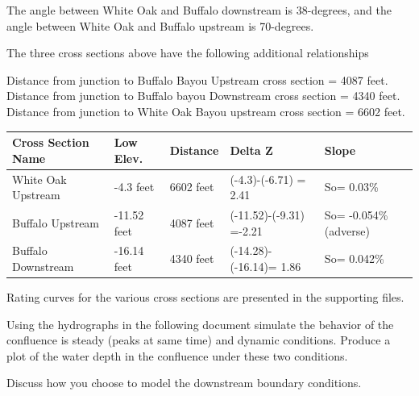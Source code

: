 \documentclass[12pt]{article}
\begin{document}
The angle between White Oak and Buffalo downstream is 38-degrees, and the angle between White Oak and Buffalo upstream is 70-degrees.

The three cross sections above have the following additional relationships

Distance from junction to Buffalo Bayou Upstream cross section = 4087 feet.\\
Distance from junction to Buffalo bayou Downstream cross section = 4340 feet.\\
Distance from junction to White Oak Bayou upstream cross section = 6602 feet.\\

\begin{tabular}{p{1.5in}p{0.9in}p{0.8in}p{1.65in}p{1in}}
Cross Section Name & Low Elev.&Distance& Delta Z&Slope \\
\hline
\hline
White Oak Upstream & -4.3 feet & 6602 feet & (-4.3)-(-6.71) = 2.41& So=  0.03\% \\
Buffalo Upstream & -11.52 feet & 4087 feet & (-11.52)-(-9.31) =-2.21 &So= -0.054\% (adverse) \\
Buffalo Downstream &  -16.14 feet &4340 feet & (-14.28)-(-16.14)= 1.86 &So=  0.042\% \\
\hline
\end{tabular}

Rating curves for the various cross sections are presented in the supporting files.

Using the hydrographs in the following document simulate the behavior of the confluence is steady (peaks at same time) and dynamic conditions.
Produce a plot of the water depth in the confluence under these two conditions.

Discuss how you choose to model the downstream boundary conditions.




\end{document}
